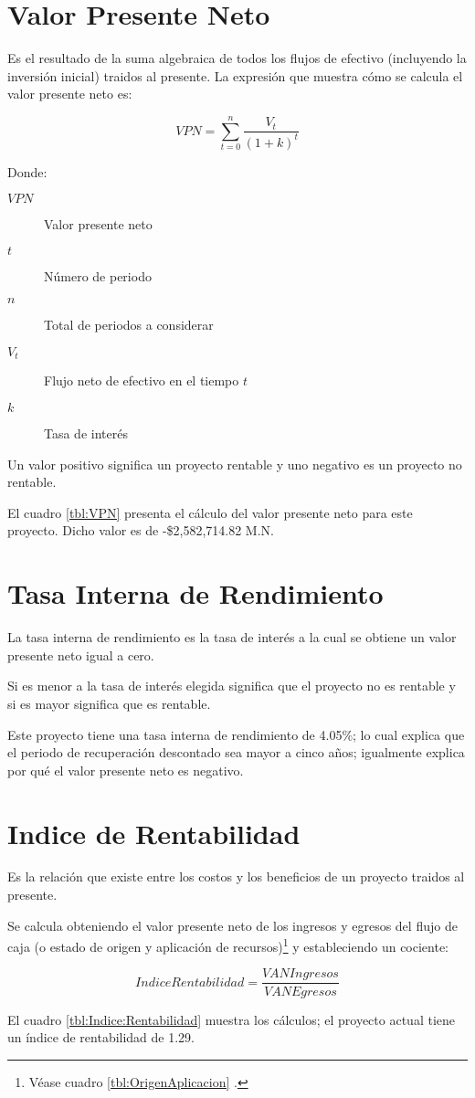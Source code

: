 \section{Valor Presente Neto}

Es el resultado de la suma algebraica de todos los flujos de efectivo (incluyendo la inversión inicial) traidos al presente. La expresión que muestra cómo se calcula el valor presente neto es:

$$VPN = \sum_{t=0}^{n}{\frac{V_t}{\left(1+k\right)^t}}$$

Donde:

\begin{description}
	\item[$VPN$] Valor presente neto
	\item[$t$] Número de periodo
	\item[$n$] Total de periodos a considerar
	\item[$V_t$] Flujo neto de efectivo en el tiempo $t$
	\item[$k$] Tasa de interés
\end{description}

Un valor positivo significa un proyecto rentable y uno negativo es un proyecto no rentable.

El cuadro \ref{tbl:VPN} presenta el cálculo del valor presente neto para este proyecto. Dicho valor es de -\$2,582,714.82 M.N.



\section{Tasa Interna de Rendimiento}

La tasa interna de rendimiento es la tasa de interés a la cual se obtiene un valor presente neto igual a cero.

Si es menor a la tasa de interés elegida significa que el proyecto no es rentable y si es mayor significa que es rentable.

Este proyecto tiene una tasa interna de rendimiento de 4.05\%; lo cual explica que el periodo de recuperación descontado sea mayor a cinco años; igualmente explica por qué el valor presente neto es negativo.

\section{Indice de Rentabilidad}

Es la relación que existe entre los costos y los beneficios de un proyecto traidos al presente.

Se calcula obteniendo el valor presente neto de los ingresos y egresos del flujo de caja (o estado de origen y aplicación de recursos)\footnote{Véase cuadro \ref{tbl:OrigenAplicacion} \pageref{tbl:OrigenAplicacion}.} y estableciendo un cociente:

$$Indice Rentabilidad = \frac{VAN Ingresos}{VAN Egresos} $$

El cuadro \ref{tbl:Indice:Rentabilidad} muestra los cálculos; el proyecto actual tiene un índice de rentabilidad de 1.29.



